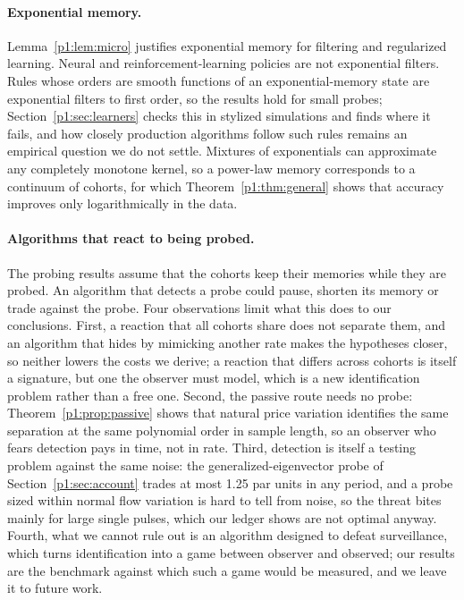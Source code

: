 \paragraph{Exponential memory.} Lemma~\ref{p1:lem:micro} justifies exponential memory for filtering and regularized learning. Neural and reinforcement-learning policies are not exponential filters. Rules whose orders are smooth functions of an exponential-memory state are exponential filters to first order, so the results hold for small probes; Section~\ref{p1:sec:learners} checks this in stylized simulations and finds where it fails, and how closely production algorithms follow such rules remains an empirical question we do not settle. Mixtures of exponentials can approximate any completely monotone kernel, so a power-law memory corresponds to a continuum of cohorts, for which Theorem~\ref{p1:thm:general} shows that accuracy improves only logarithmically in the data.

\paragraph{Algorithms that react to being probed.} The probing results assume that the cohorts keep their memories while they are probed. An algorithm that detects a probe could pause, shorten its memory or trade against the probe. Four observations limit what this does to our conclusions. First, a reaction that all cohorts share does not separate them, and an algorithm that hides by mimicking another rate makes the hypotheses closer, so neither lowers the costs we derive; a reaction that differs across cohorts is itself a signature, but one the observer must model, which is a new identification problem rather than a free one. Second, the passive route needs no probe: Theorem~\ref{p1:prop:passive} shows that natural price variation identifies the same separation at the same polynomial order in sample length, so an observer who fears detection pays in time, not in rate. Third, detection is itself a testing problem against the same noise: the generalized-eigenvector probe of Section~\ref{p1:sec:account} trades at most 1.25 par units in any period, and a probe sized within normal flow variation is hard to tell from noise, so the threat bites mainly for large single pulses, which our ledger shows are not optimal anyway. Fourth, what we cannot rule out is an algorithm designed to defeat surveillance, which turns identification into a game between observer and observed; our results are the benchmark against which such a game would be measured, and we leave it to future work.

